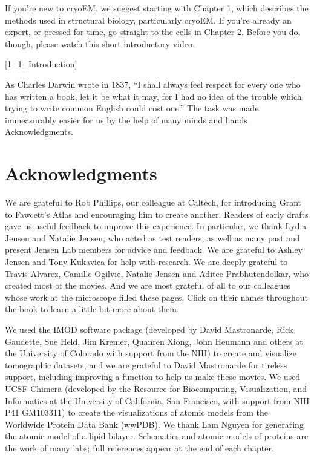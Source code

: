 \documentclass[]{tufte-book}
\begin{document}
If you're new to cryoEM, we suggest starting with Chapter 1, which
describes the methods used in structural biology, particularly cryoEM.
If you're already an expert, or pressed for time, go straight to the
cells in Chapter 2. Before you do, though, please watch this short
introductory video.

{[}1\_1\_Introduction{]}

As Charles Darwin wrote in 1837, ``I shall always feel respect for every
one who has written a book, let it be what it may, for I had no idea of
the trouble which trying to write common English could cost one.'' The
task was made immeasurably easier for us by the help of many minds and
hands \protect\hyperlink{acknowledgments}{Acknowledgments}.

\hypertarget{acknowledgments}{\section*{Acknowledgments}\label{acknowledgments}}

We are grateful to Rob Phillips, our colleague at Caltech, for
introducing Grant to Fawcett's Atlas and encouraging him to create
another. Readers of early drafts gave us useful feedback to improve this
experience. In particular, we thank Lydia Jensen and Natalie Jensen, who
acted as test readers, as well as many past and present Jensen Lab
members for advice and feedback. We are grateful to Ashley Jensen and
Tony Kukavica for help with research. We are deeply grateful to Travis
Alvarez, Camille Ogilvie, Natalie Jensen and Aditee Prabhutendolkar, who
created most of the movies. And we are most grateful of all to our
colleagues whose work at the microscope filled these pages. Click on
their names throughout the book to learn a little bit more about them.

We used the IMOD software package (developed by David Mastronarde, Rick
Gaudette, Sue Held, Jim Kremer, Quanren Xiong, John Heumann and others
at the University of Colorado with support from the NIH) to create and
visualize tomographic datasets, and we are grateful to David Mastronarde
for tireless support, including improving a function to help us make
these movies. We used UCSF Chimera (developed by the Resource for
Biocomputing, Visualization, and Informatics at the University of
California, San Francisco, with support from NIH P41 GM103311) to create
the visualizations of atomic models from the Worldwide Protein Data Bank
(wwPDB). We thank Lam Nguyen for generating the atomic model of a lipid
bilayer. Schematics and atomic models of proteins are the work of many
labs; full references appear at the end of each chapter.
\end{document}
